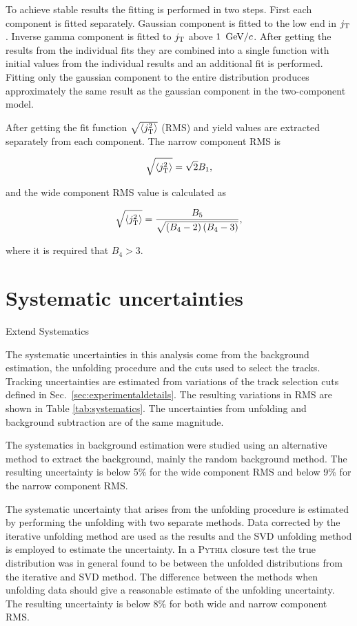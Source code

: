 To achieve stable results the fitting is performed in two steps. First each component is fitted separately. Gaussian component is fitted to the low end in $j_{\rm T}$. Inverse gamma component is fitted to $j_{\rm T}$ above $\unit[1]{\gevc}$. After getting the results from the individual fits they are combined into a single function with initial values from the individual results and an additional fit is performed. Fitting only the gaussian component to the entire distribution produces approximately the same result as the gaussian component in the two-component model.

After getting the fit function $\sqrt{\left<j_{\rm T}^2\right>}$ (RMS) and yield values are  extracted separately from each component. The narrow component RMS is

$$\sqrt{\left<j_{\rm T}^2\right>}=\sqrt{2}B_1,$$

and the wide component RMS value is calculated as 

$$\sqrt{\left<j_{\rm T}^2\right>}=\frac{B_5}{\sqrt{\left(B_4-2\right)\left(B_4-3\right)}},$$

where it is required that $B_4 > 3$.

\section{Systematic uncertainties}
{\color{red} Extend Systematics}

\label{sec:systematicerrors}
The systematic uncertainties in this analysis come from the background estimation, the unfolding procedure and the cuts used to select the tracks. Tracking uncertainties are estimated from variations of the track selection cuts defined in Sec.~\ref{sec:experimentaldetails}. The resulting variations in RMS are shown in Table \ref{tab:systematics}. The uncertainties from unfolding and background subtraction are of the same magnitude. 

The systematics in background estimation were studied using an alternative method to extract the background, mainly the random background method. The resulting uncertainty is below 5\% for the wide component RMS and below 9\% for the narrow component RMS. 

The systematic uncertainty that arises from the unfolding procedure is estimated by performing the unfolding with two separate methods. Data corrected by the iterative unfolding method are used as the results and the SVD unfolding method is employed to estimate the uncertainty. In a \textsc{Pythia} closure test the true distribution was in general found to be between the unfolded distributions from the iterative and SVD method. The difference between the methods when unfolding data should give a reasonable estimate of the unfolding uncertainty. The resulting uncertainty is below 8\% for both wide and narrow component RMS.


